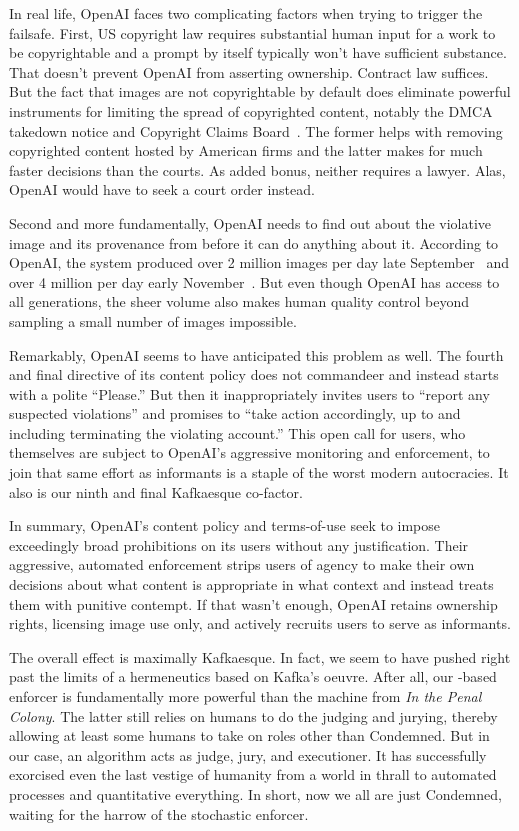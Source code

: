In real life, OpenAI faces two complicating factors when trying to trigger the
failsafe. First, US copyright law requires substantial human input for a work to
be copyrightable and a prompt by itself typically won't have sufficient
substance. That doesn't prevent OpenAI from asserting ownership. Contract law
suffices. But the fact that images are not copyrightable by default does
eliminate powerful instruments for limiting the spread of copyrighted content,
notably the DMCA takedown notice and Copyright Claims Board~\cite{CCB2022}. The
former helps with removing copyrighted content hosted by American firms and the
latter makes for much faster decisions than the courts. As added bonus, neither
requires a lawyer. Alas, OpenAI would have to seek a court order instead.

Second and more fundamentally, OpenAI needs to find out about the violative
image and its provenance from \DALLE before it can do anything about it.
According to OpenAI, the system produced over 2 million images per day late
September~\cite{OpenAI2022a} and over 4 million per day early
November~\cite{OpenAI2022h}. But even though OpenAI has access to all
generations, the sheer volume also makes human quality control beyond sampling a
small number of images impossible.

Remarkably, OpenAI seems to have anticipated this problem as well. The fourth
and final directive of its content policy does not commandeer and instead starts
with a polite “Please.” But then it inappropriately invites users to “report any
suspected violations” and promises to “take action accordingly, up to and
including terminating the violating account.” This open call for users, who
themselves are subject to OpenAI's aggressive monitoring and enforcement, to
join that same effort as informants is a staple of the worst modern autocracies.
It also is our ninth and final Kafkaesque co-factor.

In summary, OpenAI's content policy and terms-of-use seek to impose exceedingly
broad prohibitions on its users without any justification. Their aggressive,
automated enforcement strips users of agency to make their own decisions about
what content is appropriate in what context and instead treats them with
punitive contempt. If that wasn't enough, OpenAI retains ownership rights,
licensing image use only, and actively recruits users to serve as informants.

The overall effect is maximally Kafkaesque. In fact, we seem to have pushed
right past the limits of a hermeneutics based on Kafka's oeuvre. After all, our
\AI-based enforcer is fundamentally more powerful than the machine from \emph{In
the Penal Colony}. The latter still relies on humans to do the judging and
jurying, thereby allowing at least some humans to take on roles other than
Condemned. But in our case, an algorithm acts as judge, jury, and executioner.
It has successfully exorcised even the last vestige of humanity from a world in
thrall to automated processes and quantitative everything. In short, now we all
are just Condemned, waiting for the harrow of the stochastic enforcer.


